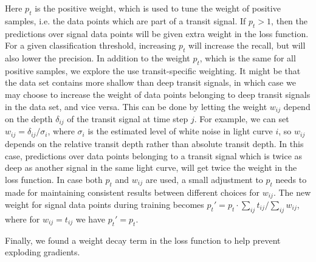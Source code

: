 Here $p_t$ is the positive weight, which is used to tune the weight of positive samples, i.e. the data points which are part of a transit signal. If $p_t > 1$, then the predictions over signal data points will be given extra weight in the loss function. For a given classification threshold, increasing $p_t$ will increase the recall, but will also lower the precision. In addition to the weight $p_t$, which is the same for all positive samples, we explore the use transit-specific weighting. It might be that the data set contains more shallow than deep transit signals, in which case we may choose to increase the weight of data points belonging to deep transit signals in the data set, and vice versa. This can be done by letting the weight $w_{ij}$ depend on the depth $\delta_{ij}$ of the transit signal at time step $j$. For example, we can set $w_{ij} = \delta_{ij} / \sigma_{i}$, where $\sigma_i$ is the estimated level of white noise in light curve $i$, so $w_{ij}$ depends on the relative transit depth rather than absolute transit depth. In this case, predictions over data points belonging to a transit signal which is twice as deep as another signal in the same light curve, will get twice the weight in the loss function. In case both $p_t$ and $w_{ij}$ are used, a small adjustment to $p_t$ needs to made for maintaining consistent results between different choices for $w_{ij}$. The new weight for signal data points during training becomes  $p_t' = p_t \cdot \sum_{ij} t_{ij} / \sum_{ij} w_{ij}$, where for $w_{ij} = t_{ij}$ we have $p_t' = p_t$.

Finally, we found a weight decay term in the loss function to help prevent exploding gradients. 



